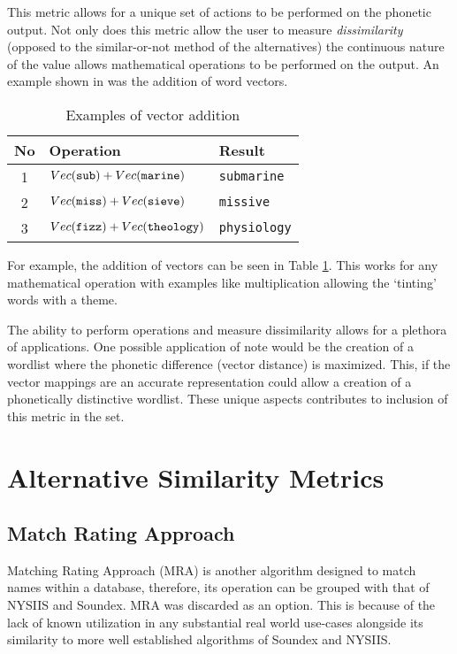 This metric allows for a unique set of actions to be performed on the phonetic output. Not only does this metric allow the user to measure \textit{dissimilarity} (opposed to the similar-or-not method of the alternatives) the continuous nature of the value allows mathematical operations to be performed on the output. An example shown in \cite{parrish2017poetic} was the addition of word vectors.

\begin{table}[!htb]
    \centering
    \begin{tabular}{cll}
        No & Operation & Result \\
        \hline
        1  & $Vec(\verb|sub|) + Vec(\verb|marine|)$ & \verb|submarine| \\
        2  & $Vec(\verb|miss|) + Vec(\verb|sieve|)$ & \verb|missive| \\
        3  & $Vec(\verb|fizz|) + Vec(\verb|theology|)$ & \verb|physiology| \\
    \end{tabular}
    \caption{Examples of vector addition}
    \label{tab:vectorAdd}
\end{table}

For example, the addition of vectors can be seen in Table \ref{tab:vectorAdd}. This works for any mathematical operation with examples like multiplication allowing the `tinting' words with a theme.

The ability to perform operations and measure dissimilarity allows for a plethora of applications. One possible application of note would be the creation of a wordlist where the phonetic difference (vector distance) is maximized. This, if the vector mappings are an accurate representation could allow a creation of a phonetically distinctive wordlist. These unique aspects contributes to inclusion of this metric in the set.

\section{Alternative Similarity Metrics}

\subsection{Match Rating Approach}
Matching Rating Approach (MRA) is another algorithm designed to match names within a database, therefore, its operation can be grouped with that of NYSIIS and Soundex. MRA was discarded as an option. This is because of the lack of known utilization in any substantial real world use-cases alongside its similarity to more well established algorithms of Soundex and NYSIIS.

